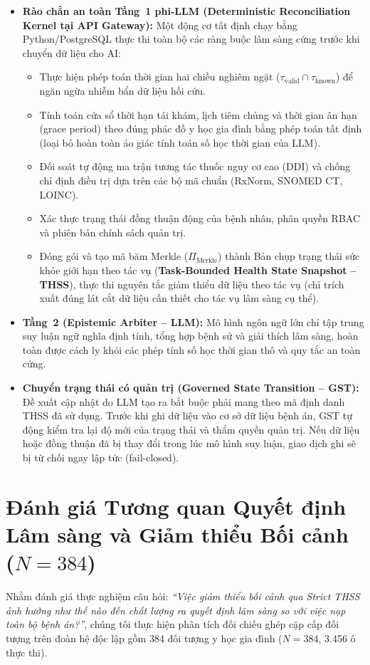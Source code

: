 \documentclass[11pt]{article}
\begin{document}
\begin{itemize}[leftmargin=1.8em]
\item \textbf{Rào chắn an toàn Tầng~1 phi-LLM (Deterministic Reconciliation Kernel tại API Gateway):} Một động cơ tất định chạy bằng Python/PostgreSQL thực thi toàn bộ các ràng buộc lâm sàng cứng trước khi chuyển dữ liệu cho AI:
\begin{itemize}
  \item Thực hiện phép toán thời gian hai chiều nghiêm ngặt ($\tau_{\text{valid}} \cap \tau_{\text{known}}$) để ngăn ngừa nhiễm bẩn dữ liệu hồi cứu.
  \item Tính toán cửa sổ thời hạn tái khám, lịch tiêm chủng và thời gian ân hạn (grace period) theo đúng phác đồ y học gia đình bằng phép toán tất định (loại bỏ hoàn toàn ảo giác tính toán số học thời gian của LLM).
  \item Đối soát tự động ma trận tương tác thuốc nguy cơ cao (DDI) và chống chỉ định điều trị dựa trên các bộ mã chuẩn (RxNorm, SNOMED CT, LOINC).
  \item Xác thực trạng thái đồng thuận động của bệnh nhân, phân quyền RBAC và phiên bản chính sách quản trị.
  \item Đóng gói và tạo mã băm Merkle ($\Pi_{\text{Merkle}}$) thành Bản chụp trạng thái sức khỏe giới hạn theo tác vụ (\textbf{Task-Bounded Health State Snapshot -- THSS}), thực thi nguyên tắc giảm thiểu dữ liệu theo tác vụ (chỉ trích xuất đúng lát cắt dữ liệu cần thiết cho tác vụ lâm sàng cụ thể).
\end{itemize}
\item \textbf{Tầng~2 (Epistemic Arbiter -- LLM):} Mô hình ngôn ngữ lớn chỉ tập trung suy luận ngữ nghĩa định tính, tổng hợp bệnh sử và giải thích lâm sàng, hoàn toàn được cách ly khỏi các phép tính số học thời gian thô và quy tắc an toàn cứng.
\item \textbf{Chuyển trạng thái có quản trị (Governed State Transition -- GST):} Đề xuất cập nhật do LLM tạo ra bắt buộc phải mang theo mã định danh THSS đã sử dụng. Trước khi ghi dữ liệu vào cơ sở dữ liệu bệnh án, GST tự động kiểm tra lại độ mới của trạng thái và thẩm quyền quản trị. Nếu dữ liệu hoặc đồng thuận đã bị thay đổi trong lúc mô hình suy luận, giao dịch ghi sẽ bị từ chối ngay lập tức (fail-closed).
\end{itemize}

\section{Đánh giá Tương quan Quyết định Lâm sàng và Giảm thiểu Bối cảnh ($N=384$)}
Nhằm đánh giá thực nghiệm câu hỏi: \emph{``Việc giảm thiểu bối cảnh qua Strict THSS ảnh hưởng như thế nào đến chất lượng ra quyết định lâm sàng so với việc nạp toàn bộ bệnh án?''}, chúng tôi thực hiện phân tích đối chiếu ghép cặp cấp đối tượng trên đoàn hệ độc lập gồm 384 đối tượng y học gia đình ($N=384$, 3.456 ô thực thi).
\end{document}
